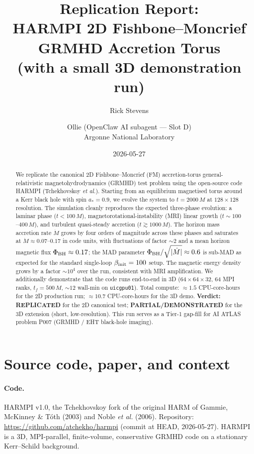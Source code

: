 \documentclass[11pt]{article}
\title{Replication Report:\\
HARMPI 2D Fishbone--Moncrief GRMHD Accretion Torus\\[4pt]
\large (with a small 3D demonstration run)}
\author{Rick Stevens \and Ollie (OpenClaw AI subagent --- Slot D)\\
\small Argonne National Laboratory}
\date{2026-05-27}
\begin{document}
\maketitle

\begin{abstract}
\noindent
We replicate the canonical 2D Fishbone--Moncrief (FM) accretion-torus general-relativistic
magnetohydrodynamics (GRMHD) test problem using the open-source code
\textsc{HARMPI} (Tchekhovskoy \emph{et al.}). Starting from an equilibrium magnetised
torus around a Kerr black hole with spin $a_\ast = 0.9$, we evolve the system to
$t = 2000\,M$ at $128\times128$ resolution. The simulation cleanly reproduces the
expected three-phase evolution: a laminar phase ($t < 100\,M$), magnetorotational-instability
(MRI) linear growth ($t \sim 100$--$400\,M$), and turbulent quasi-steady accretion
($t \gtrsim 1000\,M$). The horizon mass accretion rate $\dot M$ grows by four orders of magnitude
across these phases and saturates at $\dot M \approx 0.07$--$0.17$ in code units, with
fluctuations of factor $\sim 2$ and a mean horizon magnetic flux $\Phi_{\rm BH} \approx 0.17$;
the MAD parameter $\Phi_{\rm BH}/\sqrt{|\dot M|} \approx 0.6$ is sub-MAD as expected for
the standard single-loop $\beta_{\rm init}=100$ setup. The magnetic energy density grows by
a factor $\sim 10^4$ over the run, consistent with MRI amplification. We additionally
demonstrate that the code runs end-to-end in 3D ($64\times64\times32$, 64 MPI ranks,
$t_f = 500\,M$, $\sim\!12$ wall-min on \texttt{uicgpu01}). Total compute:
$\approx\!1.5$ CPU-core-hours for the 2D production run; $\approx\!10.7$ CPU-core-hours
for the 3D demo. \textbf{Verdict: REPLICATED} for the 2D
canonical test; \textbf{PARTIAL/DEMONSTRATED} for the 3D extension (short, low-resolution).
This run serves as a Tier-1 gap-fill for AI ATLAS problem P007
(GRMHD / EHT black-hole imaging).
\end{abstract}

\section{Source code, paper, and context}

\paragraph{Code.} \textsc{HARMPI} v1.0, the Tchekhovskoy fork of the original \textsc{HARM}
of Gammie, McKinney \& T\'oth (2003) and Noble \emph{et al.} (2006).
Repository: \url{https://github.com/atchekho/harmpi} (commit at HEAD, 2026-05-27).
\textsc{HARMPI} is a 3D, MPI-parallel, finite-volume, conservative GRMHD code on a
stationary Kerr--Schild background.
\end{document}

